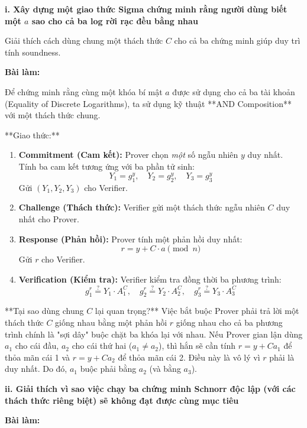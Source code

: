 \textbf{i. Xây dựng một giao thức Sigma chứng minh rằng người dùng biết một $a$ sao cho cả ba log rời rạc đều bằng nhau}

Giải thích cách dùng chung một thách thức $C$ cho cả ba chứng minh giúp duy trì tính soundness.

\textbf{Bài làm:}

Để chứng minh rằng cùng một khóa bí mật $a$ được sử dụng cho cả ba tài khoản (Equality of Discrete Logarithms), ta sử dụng kỹ thuật **AND Composition** với một thách thức chung.

**Giao thức:**
\begin{enumerate}
    \item \textbf{Commitment (Cam kết):}
    Prover chọn \textit{một} số ngẫu nhiên $y$ duy nhất.
    Tính ba cam kết tương ứng với ba phần tử sinh:
    \[
    Y_1 = g_1^y, \quad Y_2 = g_2^y, \quad Y_3 = g_3^y
    \]
    Gửi $(Y_1, Y_2, Y_3)$ cho Verifier.
    
    \item \textbf{Challenge (Thách thức):}
    Verifier gửi một thách thức ngẫu nhiên $C$ duy nhất cho Prover.
    
    \item \textbf{Response (Phản hồi):}
    Prover tính một phản hồi duy nhất:
    \[
    r = y + C \cdot a \pmod{n}
    \]
    Gửi $r$ cho Verifier.
    
    \item \textbf{Verification (Kiểm tra):}
    Verifier kiểm tra đồng thời ba phương trình:
    \[
    g_1^r \stackrel{?}{=} Y_1 \cdot A_1^C, \quad g_2^r \stackrel{?}{=} Y_2 \cdot A_2^C, \quad g_3^r \stackrel{?}{=} Y_3 \cdot A_3^C
    \]
\end{enumerate}

**Tại sao dùng chung $C$ lại quan trọng?**
Việc bắt buộc Prover phải trả lời một thách thức $C$ giống nhau bằng một phản hồi $r$ giống nhau cho cả ba phương trình chính là "sợi dây" buộc chặt ba khóa lại với nhau.
Nếu Prover gian lận dùng $a_1$ cho cái đầu, $a_2$ cho cái thứ hai ($a_1 \neq a_2$), thì hắn sẽ cần tính $r = y + C a_1$ để thỏa mãn cái 1 và $r = y + C a_2$ để thỏa mãn cái 2. Điều này là vô lý vì $r$ phải là duy nhất. Do đó, $a_1$ buộc phải bằng $a_2$ (và bằng $a_3$).

\textbf{ii. Giải thích vì sao việc chạy ba chứng minh Schnorr độc lập (với các thách thức riêng biệt) sẽ không đạt được cùng mục tiêu}

\textbf{Bài làm:}

